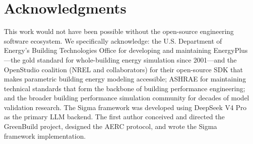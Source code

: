\documentclass[11pt,a4paper]{article}
\begin{document}
\section*{Acknowledgments}

This work would not have been possible without the open-source engineering software ecosystem. We specifically acknowledge: the U.S. Department of Energy's Building Technologies Office for developing and maintaining EnergyPlus---the gold standard for whole-building energy simulation since 2001---and the OpenStudio coalition (NREL and collaborators) for their open-source SDK that makes parametric building energy modeling accessible; ASHRAE for maintaining technical standards that form the backbone of building performance engineering; and the broader building performance simulation community for decades of model validation research. The Sigma framework was developed using DeepSeek V4 Pro as the primary LLM backend. The first author conceived and directed the GreenBuild project, designed the AERC protocol, and wrote the Sigma framework implementation.
\end{document}
